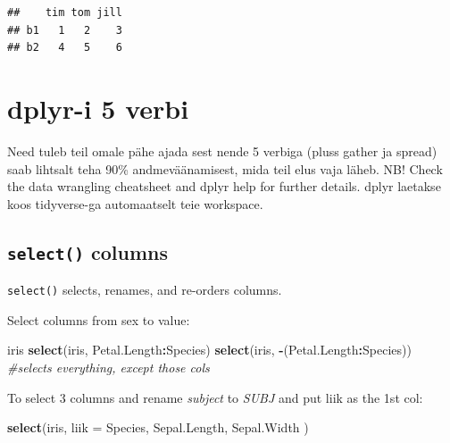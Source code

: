 \documentclass[]{book}
\newenvironment{Shaded}{\begin{snugshade}}{\end{snugshade}}
\newcommand{\KeywordTok}[1]{\textcolor[rgb]{0.13,0.29,0.53}{\textbf{#1}}}
\newcommand{\DataTypeTok}[1]{\textcolor[rgb]{0.13,0.29,0.53}{#1}}
\newcommand{\DecValTok}[1]{\textcolor[rgb]{0.00,0.00,0.81}{#1}}
\newcommand{\StringTok}[1]{\textcolor[rgb]{0.31,0.60,0.02}{#1}}
\newcommand{\CommentTok}[1]{\textcolor[rgb]{0.56,0.35,0.01}{\textit{#1}}}
\newcommand{\OperatorTok}[1]{\textcolor[rgb]{0.81,0.36,0.00}{\textbf{#1}}}
\newcommand{\NormalTok}[1]{#1}
\begin{document}
\begin{Shaded}
\end{Shaded}

\begin{verbatim}
##    tim tom jill
## b1   1   2    3
## b2   4   5    6
\end{verbatim}

\section{dplyr-i 5 verbi}\label{dplyr-i-5-verbi}

Need tuleb teil omale pähe ajada sest nende 5 verbiga (pluss gather ja
spread) saab lihtsalt teha 90\% andmeväänamisest, mida teil elus vaja
läheb. NB! Check the data wrangling cheatsheet and dplyr help for
further details. dplyr laetakse koos tidyverse-ga automaatselt teie
workspace.

\subsection{\texorpdfstring{\texttt{select()}
columns}{select() columns}}\label{select-columns}

\texttt{select()} selects, renames, and re-orders columns.

Select columns from sex to value:

\begin{Shaded}
\begin{Highlighting}[]
\NormalTok{iris}
\KeywordTok{select}\NormalTok{(iris, Petal.Length}\OperatorTok{:}\NormalTok{Species)}
\KeywordTok{select}\NormalTok{(iris, }\OperatorTok{-}\NormalTok{(Petal.Length}\OperatorTok{:}\NormalTok{Species)) }\CommentTok{#selects everything, except those cols}
\end{Highlighting}
\end{Shaded}

To select 3 columns and rename \emph{subject} to \emph{SUBJ} and put
liik as the 1st col:

\begin{Shaded}
\begin{Highlighting}[]
\KeywordTok{select}\NormalTok{(iris, }\DataTypeTok{liik =}\NormalTok{ Species, Sepal.Length, Sepal.Width )}
\end{Highlighting}
\end{Shaded}
\end{document}
